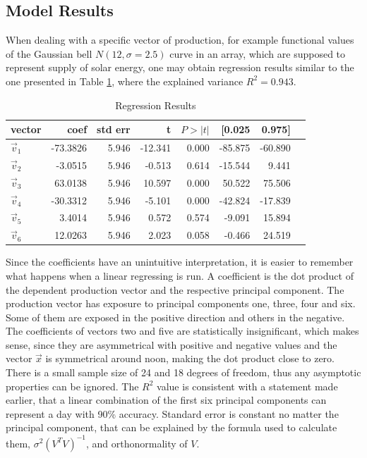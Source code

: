 \documentclass{article}
\begin{document}
\subsection{Model Results}
When dealing with a specific vector of production, for example functional values of the Gaussian bell $N(12,\sigma = 2.5)$ curve in an array, which are supposed to represent supply of solar energy, one may obtain regression results similar to the one presented in Table \ref{tab:Table 4}, where the explained variance $R^2 = 0.943$.
\begin{table}[H]
  \centering
  \caption{Regression Results}
    \begin{tabular}{lrrrrrrr}
    \toprule
    vector & coef & std err & t & $P>|t|$ & [0.025 & 0.975] \\
    \midrule
    $\vec{v}_1$ & -73.3826 & 5.946 & -12.341 & 0.000 & -85.875 & -60.890 \\
    $\vec{v}_2$ & -3.0515 & 5.946 & -0.513 & 0.614 & -15.544 & 9.441 \\
    $\vec{v}_3$ & 63.0138 & 5.946 & 10.597 & 0.000 & 50.522 & 75.506 \\
    $\vec{v}_4$ & -30.3312 & 5.946 & -5.101 & 0.000 & -42.824 & -17.839 \\
    $\vec{v}_5$ & 3.4014 & 5.946 & 0.572 & 0.574 & -9.091 & 15.894 \\
    $\vec{v}_6$ & 12.0263 & 5.946 & 2.023 & 0.058 & -0.466 & 24.519 \\
    \bottomrule
    \end{tabular}
  \label{tab:Table 4}
\end{table}
Since the coefficients have an unintuitive interpretation, it is easier to remember what happens when a linear regressing is run.
A coefficient is the dot product of the dependent production vector and the respective principal component.
The production vector has exposure to principal components one, three, four and six.
Some of them are exposed in the positive direction and others in the negative.
The coefficients of vectors two and five are statistically insignificant, which makes sense, since they are asymmetrical with positive and negative values and the vector $\vec{x}$ is symmetrical around noon, making the dot product close to zero.
There is a small sample size of 24 and 18 degrees of freedom, thus any asymptotic properties can be ignored.
The $R^2$ value is consistent with a statement made earlier, that a linear combination of the first six principal components can represent a day with 90\% accuracy.
Standard error is constant no matter the principal component, that can be explained by the formula used to calculate them, $\sigma^2(V^TV)^{-1}$, and orthonormality of $V$.
\end{document}
